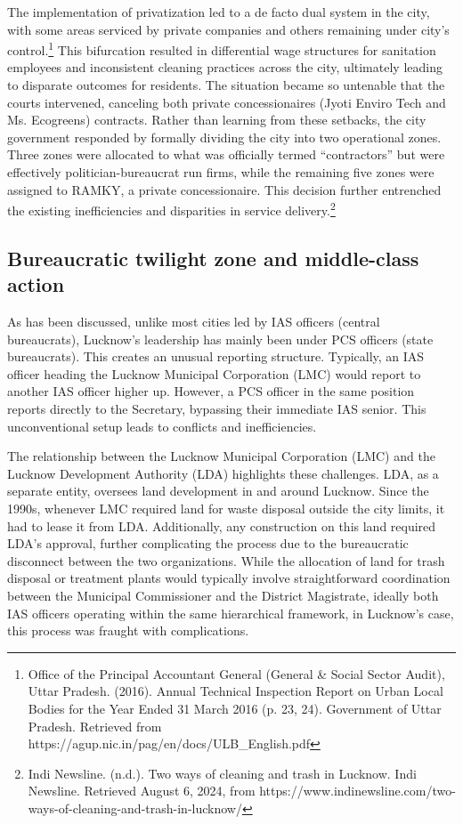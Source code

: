 The implementation of privatization led to a de facto dual system in the city, with some areas serviced by private companies and others remaining under city's control.\footnote{Office of the Principal Accountant General (General \& Social Sector Audit), Uttar Pradesh. (2016). Annual Technical Inspection Report on Urban Local Bodies for the Year Ended 31 March 2016 (p. 23, 24). Government of Uttar Pradesh. Retrieved from https://agup.nic.in/pag/en/docs/ULB\_English.pdf} This bifurcation resulted in differential wage structures for sanitation employees and inconsistent cleaning practices across the city, ultimately leading to disparate outcomes for residents. The situation became so untenable that the courts intervened, canceling both private concessionaires (Jyoti Enviro Tech and Ms. Ecogreens) contracts. Rather than learning from these setbacks, the city government responded by formally dividing the city into two operational zones. Three zones were allocated to what was officially termed ``contractors'' but were effectively politician-bureaucrat run firms, while the remaining five zones were assigned to RAMKY, a private concessionaire. This decision further entrenched the existing inefficiencies and disparities in service delivery.\footnote{Indi Newsline. (n.d.). Two ways of cleaning and trash in Lucknow. Indi Newsline. Retrieved August 6, 2024, from https://www.indinewsline.com/two-ways-of-cleaning-and-trash-in-lucknow/}

\subsection{Bureaucratic twilight zone and middle-class action}

As has been discussed, unlike most cities led by IAS officers (central bureaucrats), Lucknow's leadership has mainly been under PCS officers (state bureaucrats). This creates an unusual reporting structure. Typically, an IAS officer heading the Lucknow Municipal Corporation (LMC) would report to another IAS officer higher up. However, a PCS officer in the same position reports directly to the Secretary, bypassing their immediate IAS senior. This unconventional setup leads to conflicts and inefficiencies.

The relationship between the Lucknow Municipal Corporation (LMC) and the Lucknow Development Authority (LDA) highlights these challenges. LDA, as a separate entity, oversees land development in and around Lucknow. Since the 1990s, whenever LMC required land for waste disposal outside the city limits, it had to lease it from LDA. Additionally, any construction on this land required LDA's approval, further complicating the process due to the bureaucratic disconnect between the two organizations. While the allocation of land for trash disposal or treatment plants would typically involve straightforward coordination between the Municipal Commissioner and the District Magistrate, ideally both IAS officers operating within the same hierarchical framework, in Lucknow's case, this process was fraught with complications.

